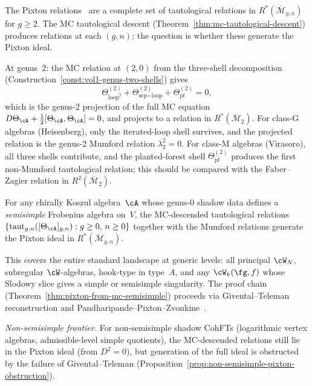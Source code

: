\begin{remark}
\label{rem:pixton-from-mc}
The Pixton relations~\cite{Janda17,PPZ19} are a complete set of
tautological relations in $R^*(\overline{\mathcal{M}}_{g,n})$ for
$g \geq 2$. The MC tautological descent
(Theorem~\ref{thm:mc-tautological-descent}) produces relations at each
$(g,n)$; the question is whether these generate the Pixton ideal.

At genus~$2$: the MC relation at $(2,0)$ from the three-shell
decomposition
(Construction~\ref{const:vol1-genus-two-shells}) gives
\[
 \Theta^{(2)}_{\mathrm{loop}^2}
 + \Theta^{(2)}_{\mathrm{sep}\circ\mathrm{loop}}
 + \Theta^{(2)}_{\mathrm{pf}}
 = 0,
\]
which is the genus-$2$ projection of the full MC equation $D\Theta_\cA + \tfrac{1}{2}[\Theta_\cA, \Theta_\cA] = 0$, and projects to a relation in
$R^*(\overline{\mathcal{M}}_2)$.
For class-G algebras (Heisenberg), only the iterated-loop shell
survives, and the projected relation is the genus-$2$ Mumford
relation $\lambda_2^2 = 0$. For class-M algebras (Virasoro),
all three shells contribute, and the planted-forest shell
$\Theta^{(2)}_{\mathrm{pf}}$ produces the first non-Mumford
tautological relation; this should be compared with the
Faber--Zagier relation in $R^2(\overline{\mathcal{M}}_2)$.
\end{remark}

\begin{theorem}
\label{thm:pixton-from-shadows}
For any chirally Koszul algebra~$\cA$ whose genus-$0$ shadow data
defines a \emph{semisimple} Frobenius algebra on~$V$, the
MC-descended tautological relations
$\{\operatorname{taut}_{g,n}([\Theta_\cA]_{g,n})
: g \geq 0,\, n \geq 0\}$
together with the Mumford relations generate the Pixton ideal
in $R^*(\overline{\mathcal{M}}_{g,n})$.

This covers the entire standard landscape at generic levels:
all principal $\cW_N$, subregular $\cW$-algebras, hook-type
in type~$A$, and any $\cW_k(\fg,f)$ whose Slodowy slice gives
a simple or semisimple singularity.
The proof chain
\textup{(}Theorem~\textup{\ref{thm:pixton-from-mc-semisimple}}\textup{)}
proceeds via Givental--Teleman reconstruction and
Pandharipande--Pixton--Zvonkine~\textup{\cite{PPZ19}}.

\emph{Non-semisimple frontier.}
For non-semisimple shadow CohFTs
(logarithmic vertex algebras, admissible-level simple quotients),
the MC-descended relations still lie in the Pixton ideal
(from $D^2 = 0$), but generation of the full ideal is
obstructed by the failure of Givental--Teleman
(Proposition~\ref{prop:non-semisimple-pixton-obstruction}).
\end{theorem}


